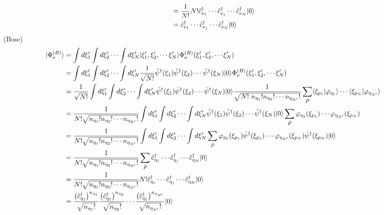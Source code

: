 \documentclass[dvipdfmx, 11pt, a4paper]{jsarticle}
\numberwithin{equation}{section}
\theoremstyle{definition}
\begin{document}
\begin{derivationBox}
\begin{align}
            &= \frac{1}{N!} N! \hat{c}_{\nu_1}^\dagger \cdots \hat{c}_{\nu_j}^\dagger\cdots \hat{c}_{\nu_N}^\dagger |0\rangle \notag \\
            &= \hat{c}_{\nu_1}^\dagger \cdots \hat{c}_{\nu_j}^\dagger\cdots \hat{c}_{\nu_N}^\dagger |0\rangle 
        \end{align}
        (Bose)
        \begin{align}
            |\Phi^{(B)}_\nu \rangle &= \int d\xi_1' \int d\xi_2' \cdots \int d\xi_N' |\xi_1',\xi_2',\cdots\xi_N' \rangle \Phi^{(B)}_\nu  (\xi_1',\xi_2',\cdots \xi_N') \notag \\
            &= \int d\xi_1' \int d\xi_2' \cdots \int d\xi_N' \frac{1}{\sqrt{N!}} \hat{\psi}^\dagger (\xi_1) \hat{\psi}^\dagger (\xi_2)\cdots \hat{\psi}^\dagger (\xi_N) |0\rangle \Phi^{(B)}_\nu  (\xi_1',\xi_2',\cdots \xi_N') \notag \\
            &= \frac{1}{\sqrt{N!}} \int d\xi_1' \int d\xi_2' \cdots \int d\xi_N' \hat{\psi}^\dagger (\xi_1) \hat{\psi}^\dagger (\xi_2)\cdots \hat{\psi}^\dagger (\xi_N) |0\rangle \frac{1}{\sqrt{N!\ n_{\eta_1}! n_{\eta_2}!\cdots n_{\eta_{N'}}!}}  \sum_{\hat{P}} \langle \xi_{p_1}|\varphi_{\eta_1} \rangle \cdots \langle \xi_{p_N}|\varphi_{\eta_{N'}} \rangle \notag \\
            &= \frac{1}{N!\sqrt{ n_{\eta_1}! n_{\eta_2}!\cdots n_{\eta_{N'}}!}} \int d\xi_1' \int d\xi_2' \cdots \int d\xi_N' \hat{\psi}^\dagger (\xi_1) \hat{\psi}^\dagger (\xi_2)\cdots \hat{\psi}^\dagger (\xi_N) |0\rangle \sum_{\hat{P}} \varphi_{\eta_ 1}(\xi_{p_1}) \cdots  \varphi_{\eta_{N'}}(\xi_{p_N}) \notag \\
            &= \frac{1}{N!\sqrt{ n_{\eta_1}! n_{\eta_2}!\cdots n_{\eta_{N'}}!}} \int d\xi_1' \int d\xi_2' \cdots \int d\xi_N' \sum_{\hat{P}} \varphi_{\eta_ 1}(\xi_{p_1}) \hat{\psi}^\dagger (\xi_{p_1}) \cdots  \varphi_{\eta_{N'}}(\xi_{p_N}) \hat{\psi}^\dagger (\xi_{p_N})|0\rangle \notag \\
            &= \frac{1}{N!\sqrt{ n_{\eta_1}! n_{\eta_2}!\cdots n_{\eta_{N'}}!}} \sum_{\hat{P}} \hat{c}_{\eta_1}^\dagger \cdots \hat{c}_{\eta_j}^\dagger\cdots \hat{c}_{\eta_N}^\dagger |0\rangle \notag \\
            &= \frac{1}{N!\sqrt{ n_{\eta_1}! n_{\eta_2}!\cdots n_{\eta_{N'}}!}} N! \hat{c}_{\eta_1}^\dagger \cdots \hat{c}_{\eta_j}^\dagger\cdots \hat{c}_{\eta_N}^\dagger |0\rangle \notag \\
            &= \frac{\left( \hat{c}_{\eta_1}^\dagger \right)^{n_{\eta_1}}} {\sqrt{n_{\eta_1}!}} \frac{\left( \hat{c}_{\eta_1}^\dagger \right)^{n_{\eta_2}}} {\sqrt{n_{\eta_2}!}} \cdots \frac{\left( \hat{c}_{\eta_1}^\dagger \right)^{n_{\eta_{N'}}}} {\sqrt{n_{\eta_{N'}}!}} |0 \rangle 
        \end{align}
    \end{derivationBox}
\end{document}
